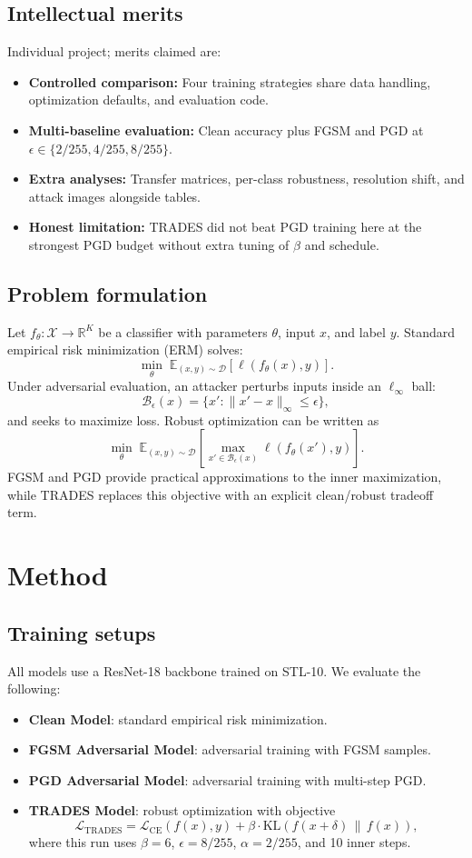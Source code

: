 \documentclass{article}
\begin{document}
\subsection{Intellectual merits}
Individual project; merits claimed are:
\begin{itemize}
\item \textbf{Controlled comparison:} Four training strategies share data handling, optimization defaults, and evaluation code.
\item \textbf{Multi-baseline evaluation:} Clean accuracy plus FGSM and PGD at $\epsilon\in\{2/255,4/255,8/255\}$.
\item \textbf{Extra analyses:} Transfer matrices, per-class robustness, resolution shift, and attack images alongside tables.
\item \textbf{Honest limitation:} TRADES did not beat PGD training here at the strongest PGD budget without extra tuning of $\beta$ and schedule.
\end{itemize}

\subsection{Problem formulation}
Let $f_\theta:\mathcal{X}\rightarrow\mathbb{R}^K$ be a classifier with parameters $\theta$, input $x$, and label $y$. Standard empirical risk minimization (ERM) solves:
\[
\min_\theta \; \mathbb{E}_{(x,y)\sim\mathcal{D}} \left[\ell\!\left(f_\theta(x),y\right)\right].
\]
Under adversarial evaluation, an attacker perturbs inputs inside an $\ell_\infty$ ball:
\[
\mathcal{B}_\epsilon(x)=\{x' : \|x'-x\|_\infty \le \epsilon\},
\]
and seeks to maximize loss. Robust optimization can be written as
\[
\min_\theta \; \mathbb{E}_{(x,y)\sim\mathcal{D}}\left[\max_{x'\in\mathcal{B}_\epsilon(x)} \ell\!\left(f_\theta(x'),y\right)\right].
\]
FGSM and PGD provide practical approximations to the inner maximization, while TRADES replaces this objective with an explicit clean/robust tradeoff term.

\section{Method}
\subsection{Training setups}
All models use a ResNet-18 backbone trained on STL-10. We evaluate the following:
\begin{itemize}
\item \textbf{Clean Model}: standard empirical risk minimization.
\item \textbf{FGSM Adversarial Model}: adversarial training with FGSM samples.
\item \textbf{PGD Adversarial Model}: adversarial training with multi-step PGD.
\item \textbf{TRADES Model}: robust optimization with objective
\[
\mathcal{L}_{\text{TRADES}} = \mathcal{L}_{\text{CE}}(f(x),y) + \beta \cdot \mathrm{KL}\left(f(x+\delta)\,\|\,f(x)\right),
\]
where this run uses $\beta=6$, $\epsilon=8/255$, $\alpha=2/255$, and 10 inner steps.
\end{itemize}
\end{document}
